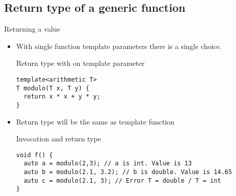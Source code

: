 \subsection{Return type of a generic function}

\begin{frame}[t,fragile]{Returning a value}


\begin{itemize}
  \item With single function template parameters there is a single choice.

\begin{block}{Return type with on template parameter}
\begin{lstlisting}
template<arithmetic T>
T modulo(T x, T y) {
  return x * x + y * y;
}
\end{lstlisting}
\end{block}

  \item Return type will be the same as template function 

\begin{block}{Invocation and return type}
\begin{lstlisting}
void f() {
  auto a = modulo(2,3); // a is int. Value is 13
  auto b = modulo(2.1, 3.2); // b is double. Value is 14.65
  auto c = modulo(2.1, 3); // Error T = double / T = int
}
\end{lstlisting}
\end{block}

\end{itemize}
\end{frame}


